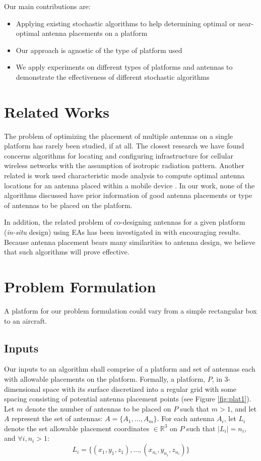 \documentclass{sig-alternate}
\begin{document}
Our main contributions are:
\begin{itemize}
    \item Applying existing stochastic algorithms to help determining optimal or near-optimal antenna placements on a platform
    \item Our approach is agnostic of the type of platform used
    \item We apply experiments on different types of platforms and antennas to demonstrate the effectiveness of different stochastic algorithms
\end{itemize}

\section{Related Works}
\label{sec:related}
The problem of optimizing the placement of multiple antennas on a single platform has rarely been studied, if at all.  The closest research we have found concerns algorithms for locating and configuring infrastructure  for cellular wireless networks with the assumption of isotropic radiation pattern.  Another related is work used characteristic mode analysis to compute optimal antenna locations for an antenna placed within a mobile device \cite{famdie2007optimal}. In our work, none of the algorithms discussed have prior information of good antenna placements or type of antennas to be placed on the platform.

In addition, the related problem of co-designing antennas for a given platform ({\em in-situ} design) using EAs has been investigated in \cite{linden2000wire} with encouraging results. Because antenna placement bears many similarities to antenna design, we believe that such algorithms will prove effective.

\section{Problem Formulation}
\label{sec:problem}
A platform for our problem formulation could vary from a simple rectangular box to an aircraft. 
\subsection{Inputs}
\label{sec:inputs}
Our inputs to an algorithm shall comprise of a platform and set of antennas each with allowable placements on the platform. Formally, a platform, $P$, in 3-dimensional space with its surface discretized into a regular grid with some spacing consisting of potential antenna placement points (see Figure \ref{fig:plat1}). Let $m$ denote the number of antennas to be placed on $P$ such that $m>1$, and let $A$ represent the set of antennas: $A = \{A_1, ..., A_m\}$.  For each antenna $A_i$, let $L_i$ denote the set allowable placement coordinates $\in \mathbb R^3$ on $P$ such that $\mid L_i \mid =n_i$, and $ \forall i, n_i>1$:
\[
L_i = \{(x_{1}, y_{1}, z_{1}), ..., (x_{n_i}, y_{n_i}, z_{n_i})\}
\]
\end{document}

